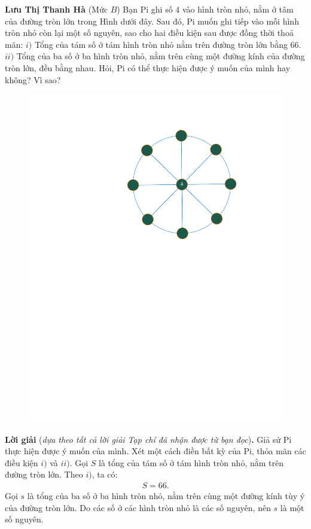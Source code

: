 \begin{multicols}{2}
	\vskip 0.15cm
	\hfill	\textbf{\color{thachthuctoanhoc}Lưu Thị Thanh Hà}
	\vskip 0.15cm
	{}
	(Mức $B$) Bạn Pi ghi số $4$ vào hình tròn nhỏ, nằm ở tâm của đường tròn lớn trong Hình dưới đây. Sau đó, Pi muốn ghi tiếp vào mỗi hình tròn nhỏ còn lại một số nguyên, sao cho hai điều kiện sau được đồng thời thoả mãn: 
	\vskip 0.05cm
	$i)$ Tổng của tám số ở tám hình tròn nhỏ nằm trên đường tròn lớn bằng $66$. 
	\vskip 0.05cm
	$ii)$ Tổng của ba số ở ba hình tròn nhỏ, nằm trên cùng một đường kính của đường tròn lớn, đều bằng nhau. 
	\vskip 0.05cm
	Hỏi, Pi có thể thực hiện được ý muốn của mình hay không? Vì sao?
	\begin{figure}[H]
		\centering
		\vspace*{-10pt}
		\captionsetup{labelformat= empty, justification=centering}
		\includegraphics[width=0.65\linewidth]{P634}
		\vspace*{-10pt}
	\end{figure}
	\textbf{\color{thachthuctoanhoc}Lời giải} (\textit{dựa theo tất cả lời giải Tạp chí đã nhận được từ bạn đọc})\textbf{\color{thachthuctoanhoc}.}
	\vskip 0.05cm
	Giả sử Pi thực hiện được ý muốn của mình.
	\vskip 0.05cm
	Xét một cách điền bất kỳ của Pi, thỏa mãn các điều kiện $i)$ và $ii)$.
	\vskip 0.05cm
	Gọi $S$ là tổng của tám số ở tám hình tròn nhỏ, nằm trên đường tròn lớn. Theo $i)$, ta có:
	\begin{align*}
		S = 66. \tag{$1$} 
	\end{align*}
	Gọi $s$ là tổng của ba số ở ba hình tròn nhỏ, nằm trên cùng một đường kính tùy ý của đường tròn lớn. Do các số ở các hình tròn nhỏ là các số nguyên, nên $s$ là một số nguyên.

\end{multicols}
